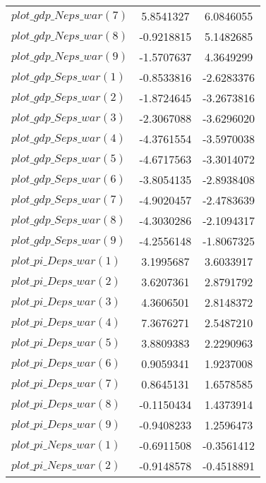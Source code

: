 \begin{center}
\begin{longtable}{lcc}
$plot\_gdp\_N eps\_war (7)  $	 & 	      5.8541327	 & 	      6.0846055 \\ 
$plot\_gdp\_N eps\_war (8)  $	 & 	     -0.9218815	 & 	      5.1482685 \\ 
$plot\_gdp\_N eps\_war (9)  $	 & 	     -1.5707637	 & 	      4.3649299 \\ 
$plot\_gdp\_S eps\_war (1)  $	 & 	     -0.8533816	 & 	     -2.6283376 \\ 
$plot\_gdp\_S eps\_war (2)  $	 & 	     -1.8724645	 & 	     -3.2673816 \\ 
$plot\_gdp\_S eps\_war (3)  $	 & 	     -2.3067088	 & 	     -3.6296020 \\ 
$plot\_gdp\_S eps\_war (4)  $	 & 	     -4.3761554	 & 	     -3.5970038 \\ 
$plot\_gdp\_S eps\_war (5)  $	 & 	     -4.6717563	 & 	     -3.3014072 \\ 
$plot\_gdp\_S eps\_war (6)  $	 & 	     -3.8054135	 & 	     -2.8938408 \\ 
$plot\_gdp\_S eps\_war (7)  $	 & 	     -4.9020457	 & 	     -2.4783639 \\ 
$plot\_gdp\_S eps\_war (8)  $	 & 	     -4.3030286	 & 	     -2.1094317 \\ 
$plot\_gdp\_S eps\_war (9)  $	 & 	     -4.2556148	 & 	     -1.8067325 \\ 
$plot\_pi\_D eps\_war (1)   $	 & 	      3.1995687	 & 	      3.6033917 \\ 
$plot\_pi\_D eps\_war (2)   $	 & 	      3.6207361	 & 	      2.8791792 \\ 
$plot\_pi\_D eps\_war (3)   $	 & 	      4.3606501	 & 	      2.8148372 \\ 
$plot\_pi\_D eps\_war (4)   $	 & 	      7.3676271	 & 	      2.5487210 \\ 
$plot\_pi\_D eps\_war (5)   $	 & 	      3.8809383	 & 	      2.2290963 \\ 
$plot\_pi\_D eps\_war (6)   $	 & 	      0.9059341	 & 	      1.9237008 \\ 
$plot\_pi\_D eps\_war (7)   $	 & 	      0.8645131	 & 	      1.6578585 \\ 
$plot\_pi\_D eps\_war (8)   $	 & 	     -0.1150434	 & 	      1.4373914 \\ 
$plot\_pi\_D eps\_war (9)   $	 & 	     -0.9408233	 & 	      1.2596473 \\ 
$plot\_pi\_N eps\_war (1)   $	 & 	     -0.6911508	 & 	     -0.3561412 \\ 
$plot\_pi\_N eps\_war (2)   $	 & 	     -0.9148578	 & 	     -0.4518891 \\ 

\end{longtable}
\end{center}

